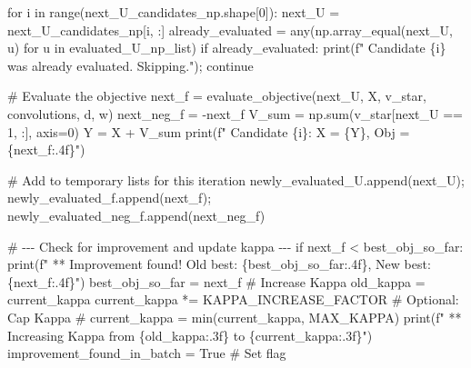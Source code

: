 \documentclass[
  letterpaper,
  DIV=11,
  numbers=noendperiod]{scrartcl}
\newenvironment{Shaded}{\begin{snugshade}}{\end{snugshade}}
\newcommand{\BuiltInTok}[1]{\textcolor[rgb]{0.00,0.23,0.31}{#1}}
\newcommand{\CommentTok}[1]{\textcolor[rgb]{0.37,0.37,0.37}{#1}}
\newcommand{\ControlFlowTok}[1]{\textcolor[rgb]{0.00,0.23,0.31}{#1}}
\newcommand{\DecValTok}[1]{\textcolor[rgb]{0.68,0.00,0.00}{#1}}
\newcommand{\KeywordTok}[1]{\textcolor[rgb]{0.00,0.23,0.31}{#1}}
\newcommand{\NormalTok}[1]{\textcolor[rgb]{0.00,0.23,0.31}{#1}}
\newcommand{\OperatorTok}[1]{\textcolor[rgb]{0.37,0.37,0.37}{#1}}
\newcommand{\SpecialCharTok}[1]{\textcolor[rgb]{0.37,0.37,0.37}{#1}}
\newcommand{\SpecialStringTok}[1]{\textcolor[rgb]{0.13,0.47,0.30}{#1}}
\newcommand{\VariableTok}[1]{\textcolor[rgb]{0.07,0.07,0.07}{#1}}
\begin{document}
\begin{Shaded}
\begin{Highlighting}[]
    \ControlFlowTok{for}\NormalTok{ i }\KeywordTok{in} \BuiltInTok{range}\NormalTok{(next\_U\_candidates\_np.shape[}\DecValTok{0}\NormalTok{]):}
\NormalTok{        next\_U }\OperatorTok{=}\NormalTok{ next\_U\_candidates\_np[i, :]}
\NormalTok{        already\_evaluated }\OperatorTok{=} \BuiltInTok{any}\NormalTok{(np.array\_equal(next\_U, u) }\ControlFlowTok{for}\NormalTok{ u }\KeywordTok{in}\NormalTok{ evaluated\_U\_np\_list)}
        \ControlFlowTok{if}\NormalTok{ already\_evaluated: }\BuiltInTok{print}\NormalTok{(}\SpecialStringTok{f"  Candidate }\SpecialCharTok{\{}\NormalTok{i}\SpecialCharTok{\}}\SpecialStringTok{ was already evaluated. Skipping."}\NormalTok{)}\OperatorTok{;} \ControlFlowTok{continue}

        \CommentTok{\# Evaluate the objective}
\NormalTok{        next\_f }\OperatorTok{=}\NormalTok{ evaluate\_objective(next\_U, X, v\_star, convolutions, d, w)}
\NormalTok{        next\_neg\_f }\OperatorTok{=} \OperatorTok{{-}}\NormalTok{next\_f}
\NormalTok{        V\_sum }\OperatorTok{=}\NormalTok{ np.}\BuiltInTok{sum}\NormalTok{(v\_star[next\_U }\OperatorTok{==} \DecValTok{1}\NormalTok{, :], axis}\OperatorTok{=}\DecValTok{0}\NormalTok{)}
\NormalTok{        Y }\OperatorTok{=}\NormalTok{ X }\OperatorTok{+}\NormalTok{ V\_sum}
        \BuiltInTok{print}\NormalTok{(}\SpecialStringTok{f"  Candidate }\SpecialCharTok{\{}\NormalTok{i}\SpecialCharTok{\}}\SpecialStringTok{: X = }\SpecialCharTok{\{}\NormalTok{Y}\SpecialCharTok{\}}\SpecialStringTok{, Obj = }\SpecialCharTok{\{}\NormalTok{next\_f}\SpecialCharTok{:.4f\}}\SpecialStringTok{"}\NormalTok{)}

        \CommentTok{\# Add to temporary lists for this iteration}
\NormalTok{        newly\_evaluated\_U.append(next\_U)}\OperatorTok{;}\NormalTok{ newly\_evaluated\_f.append(next\_f)}\OperatorTok{;}\NormalTok{ newly\_evaluated\_neg\_f.append(next\_neg\_f)}

        \CommentTok{\# {-}{-}{-} Check for improvement and update kappa {-}{-}{-}}
        \ControlFlowTok{if}\NormalTok{ next\_f }\OperatorTok{\textless{}}\NormalTok{ best\_obj\_so\_far:}
            \BuiltInTok{print}\NormalTok{(}\SpecialStringTok{f"  ** Improvement found! Old best: }\SpecialCharTok{\{}\NormalTok{best\_obj\_so\_far}\SpecialCharTok{:.4f\}}\SpecialStringTok{, New best: }\SpecialCharTok{\{}\NormalTok{next\_f}\SpecialCharTok{:.4f\}}\SpecialStringTok{"}\NormalTok{)}
\NormalTok{            best\_obj\_so\_far }\OperatorTok{=}\NormalTok{ next\_f}
            \CommentTok{\# Increase Kappa}
\NormalTok{            old\_kappa }\OperatorTok{=}\NormalTok{ current\_kappa}
\NormalTok{            current\_kappa }\OperatorTok{*=}\NormalTok{ KAPPA\_INCREASE\_FACTOR}
            \CommentTok{\# Optional: Cap Kappa}
            \CommentTok{\# current\_kappa = min(current\_kappa, MAX\_KAPPA)}
            \BuiltInTok{print}\NormalTok{(}\SpecialStringTok{f"  ** Increasing Kappa from }\SpecialCharTok{\{}\NormalTok{old\_kappa}\SpecialCharTok{:.3f\}}\SpecialStringTok{ to }\SpecialCharTok{\{}\NormalTok{current\_kappa}\SpecialCharTok{:.3f\}}\SpecialStringTok{"}\NormalTok{)}
\NormalTok{            improvement\_found\_in\_batch }\OperatorTok{=} \VariableTok{True} \CommentTok{\# Set flag}


\end{Highlighting}
\end{Shaded}
\end{document}
